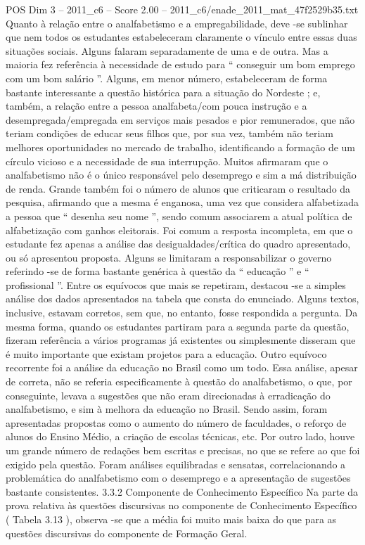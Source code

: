 \begin{textsample}{POS Dim 3 – 2011\_c6 – Score 2.00 – 2011\_c6/enade\_2011\_mat\_47f2529b35.txt}
Quanto à relação entre o analfabetismo e a empregabilidade, deve -se sublinhar que nem todos os estudantes estabeleceram claramente o vínculo entre essas duas situações sociais.
Alguns falaram separadamente de uma e de outra.
Mas a maioria fez referência à necessidade de estudo para “ conseguir um bom emprego com um bom salário ”.
Alguns, em menor número, estabeleceram de forma bastante interessante a questão histórica para a situação do Nordeste ; e, também, a relação entre a pessoa analfabeta/com pouca instrução e a desempregada/empregada em serviços mais pesados e pior remunerados, que não teriam condições de educar seus filhos que, por sua vez, também não teriam melhores oportunidades no mercado de trabalho, identificando a formação de um círculo vicioso e a necessidade de sua interrupção.
Muitos afirmaram que o analfabetismo não é o único responsável pelo desemprego e sim a má distribuição de renda.
Grande também foi o número de alunos que criticaram o resultado da pesquisa, afirmando que a mesma é enganosa, uma vez que considera alfabetizada a pessoa que “ desenha seu nome ”, sendo comum associarem a atual política de alfabetização com ganhos eleitorais.
Foi comum a resposta incompleta, em que o estudante fez apenas a análise das desigualdades/crítica do quadro apresentado, ou só apresentou proposta.
Alguns se limitaram a responsabilizar o governo referindo -se de forma bastante genérica à questão da “ educação ” e “ profissional ”.
Entre os equívocos que mais se repetiram, destacou -se a simples análise dos dados apresentados na tabela que consta do enunciado.
Alguns textos, inclusive, estavam corretos, sem que, no entanto, fosse respondida a pergunta.
Da mesma forma, quando os estudantes partiram para a segunda parte da questão, fizeram referência a vários programas já existentes ou simplesmente disseram que é muito importante que existam projetos para a educação.
Outro equívoco recorrente foi a análise da educação no Brasil como um todo.
Essa análise, apesar de correta, não se referia especificamente à questão do analfabetismo, o que, por conseguinte, levava a sugestões que não eram direcionadas à erradicação do analfabetismo, e sim à melhora da educação no Brasil.
Sendo assim, foram apresentadas propostas como o aumento do número de faculdades, o reforço de alunos do Ensino Médio, a criação de escolas técnicas, etc.
Por outro lado, houve um grande número de redações bem escritas e precisas, no que se refere ao que foi exigido pela questão.
Foram análises equilibradas e sensatas, correlacionando a problemática do analfabetismo com o desemprego e a apresentação de sugestões bastante consistentes. 3.3.2 Componente de Conhecimento Específico Na parte da prova relativa às questões discursivas no componente de Conhecimento Específico ( Tabela 3.13 ), observa -se que a média foi muito mais baixa do que para as questões discursivas do componente de Formação Geral.

\end{textsample}

